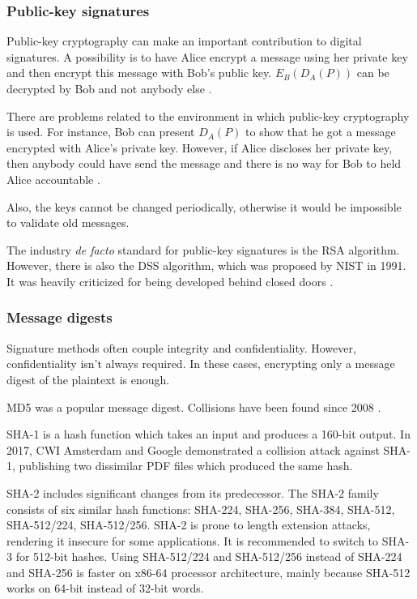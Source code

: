 \subsubsection{Public-key signatures}

Public-key cryptography can make an important contribution to digital signatures. A possibility is to have Alice encrypt a message using her private key and then encrypt this message with Bob's public key.
\(E_B(D_A(P))\) can be decrypted by Bob and not anybody else \cite[p.~799]{computer-networks-tanenbaum-2012}.

There are problems related to the environment in which public-key cryptography is used.
For instance, Bob can present \(D_A(P)\) to show that he got a message encrypted with Alice's private key.
However, if Alice discloses her private key, then anybody could have send the message and there is no way for Bob to held Alice accountable \cite[p.~800]{computer-networks-tanenbaum-2012}.

Also, the keys cannot be changed periodically, otherwise it would be impossible to validate old messages.

The industry \textit{de facto} standard for public-key signatures is the RSA algorithm.
However, there is also the DSS algorithm, which was proposed by NIST in 1991.
It was heavily criticized for being developed behind closed doors \cite[p.~800]{computer-networks-tanenbaum-2012}.

\subsubsection{Message digests}

Signature methods often couple integrity and confidentiality. However, confidentiality isn't always required.
In these cases, encrypting only a message digest of the plaintext is enough.

MD5 was a popular message digest. Collisions have been found since 2008 \cite[p.~804]{computer-networks-tanenbaum-2012}.

SHA-1 is a hash function which takes an input and produces a 160-bit output.
In 2017, CWI Amsterdam and Google demonstrated a collision attack against SHA-1, publishing two dissimilar PDF files which produced the same hash.

SHA-2 includes significant changes from its predecessor. The SHA-2 family consists of six similar hash functions: SHA-224, SHA-256, SHA-384, SHA-512, SHA-512/224, SHA-512/256.
SHA-2 is prone to length extension attacks, rendering it insecure for some applications.
It is recommended to switch to SHA-3 for 512-bit hashes.
Using SHA-512/224 and SHA-512/256 instead of SHA-224 and SHA-256 is faster on x86-64 processor architecture, mainly because SHA-512 works on 64-bit instead of 32-bit words.

